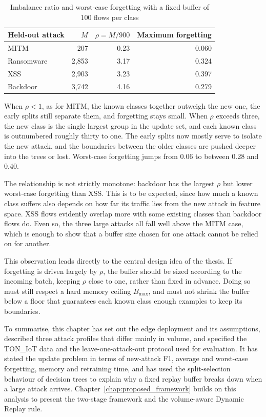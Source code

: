 \begin{table}[htpb]
\centering
\small
\renewcommand{\arraystretch}{1.3}
\caption{Imbalance ratio and worst-case forgetting with a fixed buffer of 100 flows per class}
\label{tab:rho}
\begin{tabular}{|l|r|r|r|}
\hline
\textbf{Held-out attack} & \textbf{$M$} & \textbf{$\rho = M / 900$} & \textbf{Maximum forgetting} \\ \hline
MITM       & 207     & 0.23 & 0.060 \\
Ransomware & 2{,}853 & 3.17 & 0.324 \\
XSS        & 2{,}903 & 3.23 & 0.397 \\
Backdoor   & 3{,}742 & 4.16 & 0.279 \\ \hline
\end{tabular}
\end{table}

When $\rho < 1$, as for MITM, the known classes together outweigh the new one, the early splits still separate them, and forgetting stays small. When $\rho$ exceeds three, the new class is the single largest group in the update set, and each known class is outnumbered roughly thirty to one. The early splits now mostly serve to isolate the new attack, and the boundaries between the older classes are pushed deeper into the trees or lost. Worst-case forgetting jumps from 0.06 to between 0.28 and 0.40.

The relationship is not strictly monotone: backdoor has the largest $\rho$ but lower worst-case forgetting than XSS. This is to be expected, since how much a known class suffers also depends on how far its traffic lies from the new attack in feature space. XSS flows evidently overlap more with some existing classes than backdoor flows do. Even so, the three large attacks all fall well above the MITM case, which is enough to show that a buffer size chosen for one attack cannot be relied on for another.

This observation leads directly to the central design idea of the thesis. If forgetting is driven largely by $\rho$, the buffer should be sized according to the incoming batch, keeping $\rho$ close to one, rather than fixed in advance. Doing so must still respect a hard memory ceiling $B_{\max}$, and must not shrink the buffer below a floor that guarantees each known class enough examples to keep its boundaries.

To summarise, this chapter has set out the edge deployment and its assumptions, described three attack profiles that differ mainly in volume, and specified the TON\_IoT data and the leave-one-attack-out protocol used for evaluation. It has stated the update problem in terms of new-attack F1, average and worst-case forgetting, memory and retraining time, and has used the split-selection behaviour of decision trees to explain why a fixed replay buffer breaks down when a large attack arrives. Chapter~\ref{chap:proposed_framework} builds on this analysis to present the two-stage framework and the volume-aware Dynamic Replay rule.

